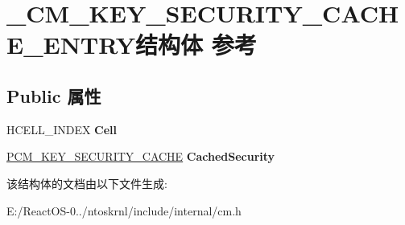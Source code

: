 \hypertarget{struct___c_m___k_e_y___s_e_c_u_r_i_t_y___c_a_c_h_e___e_n_t_r_y}{}\section{\+\_\+\+C\+M\+\_\+\+K\+E\+Y\+\_\+\+S\+E\+C\+U\+R\+I\+T\+Y\+\_\+\+C\+A\+C\+H\+E\+\_\+\+E\+N\+T\+R\+Y结构体 参考}
\label{struct___c_m___k_e_y___s_e_c_u_r_i_t_y___c_a_c_h_e___e_n_t_r_y}
\subsection*{Public 属性}
\begin{DoxyCompactItemize}
\item 
\mbox{\label{struct___c_m___k_e_y___s_e_c_u_r_i_t_y___c_a_c_h_e___e_n_t_r_y_ae74b16d5120de8b25d0095f013c896a5}} 
H\+C\+E\+L\+L\+\_\+\+I\+N\+D\+EX {\bfseries Cell}
\item 
\mbox{\label{struct___c_m___k_e_y___s_e_c_u_r_i_t_y___c_a_c_h_e___e_n_t_r_y_a5897dcc63749ddd11ab679e77a7fd510}} 
\hyperlink{struct___c_m___k_e_y___s_e_c_u_r_i_t_y___c_a_c_h_e}{P\+C\+M\+\_\+\+K\+E\+Y\+\_\+\+S\+E\+C\+U\+R\+I\+T\+Y\+\_\+\+C\+A\+C\+HE} {\bfseries Cached\+Security}
\end{DoxyCompactItemize}


该结构体的文档由以下文件生成\+:\begin{DoxyCompactItemize}
\item 
E\+:/\+React\+O\+S-\/0../ntoskrnl/include/internal/cm.\+h\end{DoxyCompactItemize}
